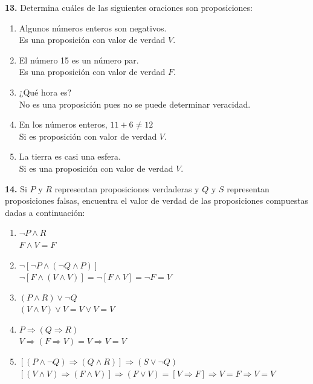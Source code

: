 \documentclass[12pt]{article}
\begin{document}
%
%
\textbf{13.} Determina cuáles de las siguientes oraciones son proposiciones:

\begin{enumerate}[label=\alph*)]
    \item Algunos números enteros son negativos.\\
    Es una proposición con valor de verdad $V$.
    \item El número 15 es un número par.\\
    Es una proposición con valor de verdad $F$.
    \item ¿Qué hora es?\\
    No es una proposición pues no se puede determinar veracidad.
    \item En los números enteros, $11 + 6 \neq 12$\\
    Si es proposición con valor de verdad $V$.
    \item La tierra es casi una esfera.\\
    Si es una proposición con valor de verdad $V$.
\end{enumerate}

%
%
\textbf{14.} Si $P$ y $R$ representan proposiciones verdaderas y $Q$ y $S$ representan proposiciones falsas,
encuentra el valor de verdad de las proposiciones compuestas dadas a continuación:

\begin{enumerate}[label=\alph*)]
    \item $\neg P \land R$\\
    $F \land V = F$

    \item $\neg [\neg P \land (\neg Q \land P)]$\\
    $\neg[F \land (V \land V)] = \neg[F \land V] = \neg F = V$

    \item $(P \land R) \lor \neg Q$\\
    $(V \land V) \lor V = V \lor V = V$

    \item $P \Longrightarrow (Q \Longrightarrow R)$\\
    $V \Longrightarrow (F \Longrightarrow V) = V \Longrightarrow V = V$

    \item $[(P \land \neg Q) \Longrightarrow (Q \land R)] \Longrightarrow (S \lor \neg Q)$\\
    $[(V \land V) \Longrightarrow (F \land V)] \Longrightarrow (F \lor V) = [V \Longrightarrow F] \Longrightarrow V = F \Longrightarrow V = V$
\end{enumerate}
\end{document}
